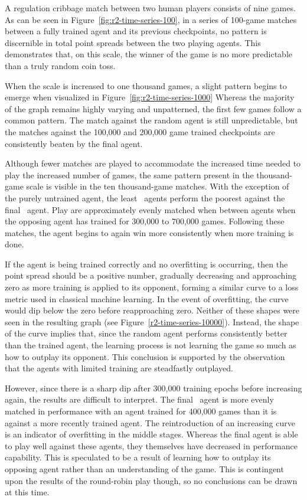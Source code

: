 A regulation cribbage match between two human players consists of nine games.
%
As can be seen in Figure~\ref{fig:r2-time-series-100},
in a series of 100-game matches between a fully trained agent and its
previous checkpoints,
no pattern is discernible in total point spreads between the two playing agents.
%
This demonstrates that,
on this scale,
the winner of the game is no more predictable than a truly random coin toss.

When the scale is increased to one thousand games,
a slight pattern begins to emerge
when visualized in Figure~\ref{fig:r2-time-series-1000}
%
Whereas the majority of the graph remains highly varying and unpatterned,
the first few games follow a common pattern.
%
The match against the random agent is still unpredictable,
but the matches against the 100,000 and 200,000 game trained checkpoints are
consistently beaten by the final agent.

Although fewer matches are played to accommodate the increased time needed to
play the increased number of games,
the same pattern present in the thousand-game scale is visible in the
ten thousand-game matches.
%
With the exception of the purely untrained agent,
the least \learned\ agents perform the poorest against the final
\learned\ agent.
%
Play are approximately evenly matched when between agents
when the opposing agent has trained for 300,000 to 700,000 games.
%
Following these matches,
the agent begins to again win more consistently when more training is done.

If the agent is being trained correctly and no overfitting is occurring,
then the point spread should be a positive number,
gradually decreasing and approaching zero
as more training is applied to its opponent,
forming a similar curve to a loss metric used in classical machine learning.
%
In the event of overfitting,
the curve would dip below the zero before reapproaching zero.
%
Neither of these shapes were seen in the resulting graph
(see Figure~\ref{r2-time-series-10000}).
%
Instead,
the shape of the curve implies that,
since the random agent performs consistently better than the trained agent,
the learning process is not learning the game so much as how to outplay its
opponent.
%
This conclusion is supported by the observation that the agents with limited
training are steadfastly outplayed.

However,
since there is a sharp dip after 300,000 training epochs before increasing
again,
the results are difficult to interpret.
%
The final \learned\ agent is more evenly matched in performance with an agent
trained for 400,000 games
than it is against a more recently trained agent.
%
The reintroduction of an increasing curve
is an indicator of overfitting in the middle stages.
%
Whereas the final agent is able to play well against these agents,
they themselves have decreased in performance capability.
%
This is speculated to be a result of learning how to outplay its opposing agent
rather than an understanding of the game.
%
This is contingent upon the results of the round-robin play though,
so no conclusions can be drawn at this time.


